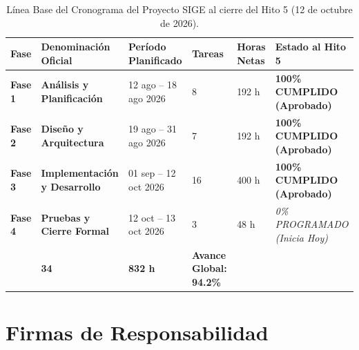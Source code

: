 \documentclass[12pt,a4paper]{article}
\begin{document}
\begin{table}[H]
\centering
\small
\renewcommand{\arraystretch}{1.2}
\begin{tabularx}{\textwidth}{|>{\hsize=0.6\hsize\centering\arraybackslash\footnotesize}X|>{\hsize=1.3\hsize\raggedright\arraybackslash\bfseries\footnotesize}X|>{\hsize=1.1\hsize\centering\arraybackslash\footnotesize}X|>{\hsize=0.5\hsize\centering\arraybackslash\footnotesize}X|>{\hsize=0.6\hsize\centering\arraybackslash\footnotesize}X|>{\hsize=1.9\hsize\centering\arraybackslash\footnotesize}X|}
\hline
\rowcolor{tableheader}
\textbf{Fase} & \textbf{Denominación Oficial} & \textbf{Período Planificado} & \textbf{Tareas} & \textbf{Horas Netas} & \textbf{Estado al Hito 5} \\
\hline
\textbf{Fase 1} & Análisis y Planificación & 12 ago -- 18 ago 2026 & 8 & 192 h & \textbf{100\% CUMPLIDO (Aprobado)} \\
\hline
\textbf{Fase 2} & Diseño y Arquitectura & 19 ago -- 31 ago 2026 & 7 & 192 h & \textbf{100\% CUMPLIDO (Aprobado)} \\
\hline
\textbf{Fase 3} & Implementación y Desarrollo & 01 sep -- 12 oct 2026 & 16 & 400 h & \textbf{100\% CUMPLIDO (Aprobado)} \\
\hline
\textbf{Fase 4} & Pruebas y Cierre Formal & 12 oct -- 13 oct 2026 & 3 & 48 h & \textit{0\% PROGRAMADO (Inicia Hoy)} \\
\hline
\multicolumn{3}{|r|}{\textbf{TOTAL GENERAL DEL PROYECTO:}} & \textbf{34} & \textbf{832 h} & \textbf{Avance Global: 94.2\%} \\
\hline
\end{tabularx}
\caption{Línea Base del Cronograma del Proyecto SIGE al cierre del Hito 5 (12 de octubre de 2026).}
\label{tab:linea_base_hito5}
\end{table}

\section{Firmas de Responsabilidad}
\end{document}
